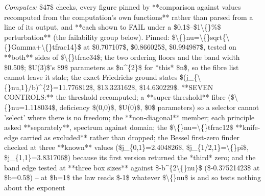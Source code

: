\begin{description}
\emph{Computes:} \$47\$ checks, every figure pinned by **comparison against values recomputed from the computation's own functions** rather than parsed from a line of its output, and **each shown to FAIL under a \$0.1\$--\$1\textbackslash\{\}\%\$ perturbation** (the failability group below). Pinned: \$\textbackslash\{\}nu=\textbackslash\{\}sqrt\{\textbackslash\{\}Gamma+\textbackslash\{\}tfrac14\}\$ at \$0.707107\$, \$0.866025\$, \$0.994987\$, tested on **both** sides of \$\textbackslash\{\}tfrac34\$; the two ordering floors and the band width \$0.50\$; \$U(3)\$'s \$9\$ parameters as \$n\textasciicircum{}\{2\}\$ for *this* \$n\$, so the fibre list cannot leave it stale; the exact Friedrichs ground states \$(j\_\{\textbackslash\{\}nu,1\}/b)\textasciicircum{}\{2\}=11.776812\$, \$13.323162\$, \$14.630229\$. **SEVEN CONTROLS:** the threshold recomputed; a **super-threshold** fibre (\$\textbackslash\{\}nu=1.118034\$, deficiency \$(0,0)\$, \$U(0)\$, \$0\$ parameters) so a selector cannot 'select' where there is no freedom; the **non-diagonal** member; each principle asked **separately**, spectrum against domain; the \$\textbackslash\{\}nu=\textbackslash\{\}tfrac12\$ **knife-edge carried as excluded** rather than dropped; the Bessel first-zero finder checked at three **known** values (\$j\_\{0,1\}=2.404826\$, \$j\_\{1/2,1\}=\textbackslash\{\}pi\$, \$j\_\{1,1\}=3.831706\$) because its first version returned the *third* zero; and the band edge tested at **three box sizes** against \$-b\textasciicircum{}\{2\textbackslash\{\}nu\}\$ (\$-0.37521423\$ at \$b=0.5\$) -- at \$b=1\$ the law reads \$-1\$ whatever \$\textbackslash\{\}nu\$ is and so tests nothing about the exponent

\end{description}
